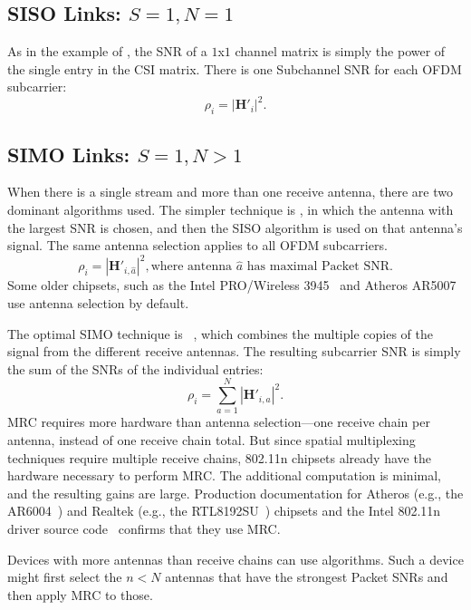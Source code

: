 \subsection{SISO Links: $S=1,N=1$}
As in the example of , the SNR of a $1$x$1$ channel matrix is simply the power of the single entry in the CSI matrix. There is one Subchannel SNR for each OFDM subcarrier:
\begin{equation}
	\rho_i = \left| \mathbf{H}'_i \right|^2.
\end{equation}

\subsection{SIMO Links: $S=1,N>1$}
When there is a single stream and more than one receive antenna, there are two dominant algorithms used. The simpler technique is , in which the antenna with the largest SNR is chosen, and then the SISO algorithm is used on that antenna's signal. The same antenna selection applies to all OFDM subcarriers.
\begin{equation}
	\rho_i = \left| \mathbf{H}'_{i,\hat{a}} \right|^2, \text{where antenna } \hat{a} \text{ has maximal Packet SNR}.
\end{equation}
Some older chipsets, such as the Intel PRO/Wireless 3945~\cite[\S3.5]{ipw3945} and Atheros AR5007~\cite{madwifi_diversity} use antenna selection by default.

The optimal SIMO technique is ~\cite{Tse}, which combines the multiple copies of the signal from the different receive antennas. The resulting subcarrier SNR is simply the sum of the SNRs of the individual entries:
\begin{equation}
	\label{eq:mrc}
	\rho_i = \sum_{a=1}^N \left| \mathbf{H}'_{i,a} \right|^2.
\end{equation}
MRC requires more hardware than antenna selection---one receive chain per antenna, instead of one receive chain total. But since spatial multiplexing techniques require multiple receive chains, 802.11n chipsets already have the hardware necessary to perform MRC. The additional computation is minimal, and the resulting gains are large. Production documentation for Atheros (e.g., the AR6004~\cite{ar6004}) and Realtek (e.g., the RTL8192SU~\cite{rtl8192su}) chipsets and the Intel 802.11n driver source code~\cite{iwlwifi} confirms that they use MRC.

Devices with more antennas than receive chains can use  algorithms. Such a device might first select the $n < N$ antennas that have the strongest Packet SNRs and then apply MRC to those.


